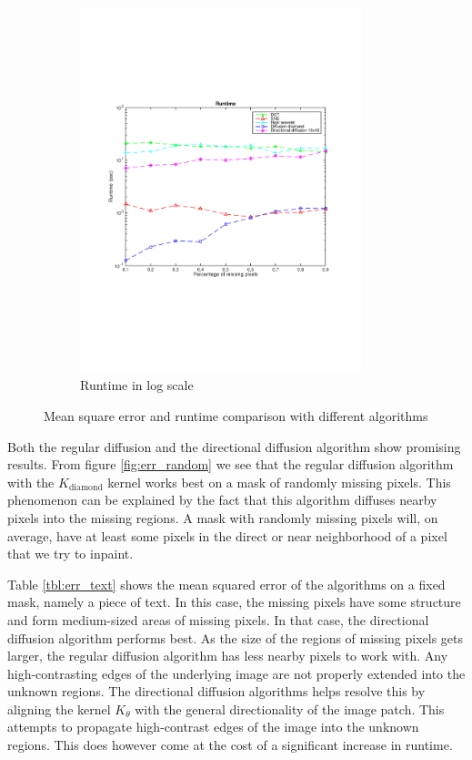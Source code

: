 \begin{figure}
\begin{subfigure}[b]{0.49\textwidth}
		\includegraphics[clip, trim=2cm 7cm 2cm 6cm, width=0.9\textwidth]{figures/runtime_vector}
		\caption{Runtime in log scale}
		\label{fig:runtime}
	\end{subfigure}
	
	\caption{Mean square error and runtime comparison with different algorithms}
	\label{fig:results}
\end{figure}


Both the regular diffusion and the directional diffusion algorithm show promising results. From figure \ref{fig:err_random} we see that the regular diffusion algorithm with the $K_{\text{diamond}}$ kernel works best on a mask of randomly missing pixels. This phenomenon can be explained by the fact that this algorithm diffuses nearby pixels into the missing regions. A mask with randomly missing pixels will, on average, have at least some pixels in the direct or near neighborhood of a pixel that we try to inpaint.


Table \ref{tbl:err_text} shows the mean squared error of the algorithms on a fixed mask, namely a piece of text. In this case, the missing pixels have some structure and form medium-sized areas of missing pixels. In that case, the directional diffusion algorithm performs best. As the size of the regions of missing pixels gets larger, the regular diffusion algorithm has less nearby pixels to work with. Any high-contrasting edges of the underlying image are not properly extended into the unknown regions. The directional diffusion algorithms helps resolve this by aligning the kernel  $K_{\theta}$ with the general directionality of the image patch. This attempts to propagate high-contrast edges of the image into the unknown regions. This does however come at the cost of a significant increase in runtime.

